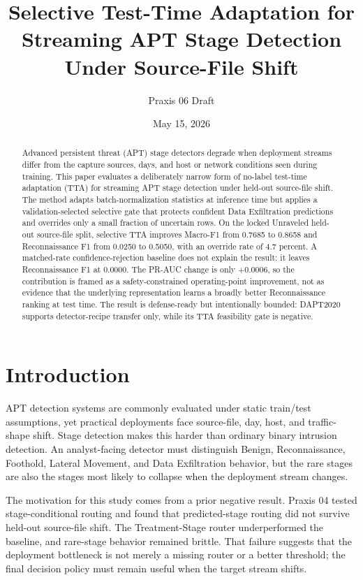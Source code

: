 \documentclass[10pt]{article}
\title{Selective Test-Time Adaptation for Streaming APT Stage Detection Under Source-File Shift}
\author{Praxis 06 Draft}
\date{May 15, 2026}
\begin{document}
\maketitle

\begin{abstract}
Advanced persistent threat (APT) stage detectors degrade when deployment streams differ from the capture sources, days, and host or network conditions seen during training.
This paper evaluates a deliberately narrow form of no-label test-time adaptation (TTA) for streaming APT stage detection under held-out source-file shift.
The method adapts batch-normalization statistics at inference time but applies a validation-selected selective gate that protects confident Data Exfiltration predictions and overrides only a small fraction of uncertain rows.
On the locked Unraveled held-out source-file split, selective TTA improves Macro-F1 from 0.7685 to 0.8658 and Reconnaissance F1 from 0.0250 to 0.5050, with an override rate of 4.7 percent.
A matched-rate confidence-rejection baseline does not explain the result: it leaves Reconnaissance F1 at 0.0000.
The PR-AUC change is only +0.0006, so the contribution is framed as a safety-constrained operating-point improvement, not as evidence that the underlying representation learns a broadly better Reconnaissance ranking at test time.
The result is defense-ready but intentionally bounded: DAPT2020 supports detector-recipe transfer only, while its TTA feasibility gate is negative.
\end{abstract}
\fi

\section{Introduction}

APT detection systems are commonly evaluated under static train/test assumptions, yet practical deployments face source-file, day, host, and traffic-shape shift.
Stage detection makes this harder than ordinary binary intrusion detection.
An analyst-facing detector must distinguish Benign, Reconnaissance, Foothold, Lateral Movement, and Data Exfiltration behavior, but the rare stages are also the stages most likely to collapse when the deployment stream changes.

The motivation for this study comes from a prior negative result.
Praxis 04 tested stage-conditional routing and found that predicted-stage routing did not survive held-out source-file shift.
The Treatment-Stage router underperformed the baseline, and rare-stage behavior remained brittle.
That failure suggests that the deployment bottleneck is not merely a missing router or a better threshold; the final decision policy must remain useful when the target stream shifts.
\end{document}
